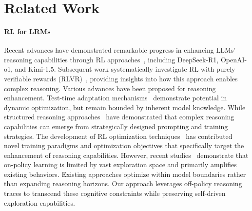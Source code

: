 \documentclass{article}
\begin{document}




\section{Related Work}

\paragraph{RL for LRMs}
Recent advances have demonstrated remarkable progress in enhancing LLMs' reasoning capabilities through RL approaches~\cite{r1, o1, kimik1.5, survey}, including DeepSeek-R1, OpenAI-o1, and Kimi-1.5.
Subsequent work systematically investigate RL with purely verifiable rewards (RLVR)~\cite{simplerl,orz,prime,drgrpo,opo}, providing insights into how this approach enables complex reasoning.
Various advances have been proposed for reasoning enhancement. Test-time adaptation mechanisms~\cite{muennighoff2025s1,zuo2025ttrl} demonstrate potential in dynamic optimization, but remain bounded by inherent model knowledge. 
While structured reasoning approaches~\cite{pang2025bolt,ye2025limo,fatemi2025concise,zhao2025absolutezero} have demonstrated that complex reasoning capabilities can emerge from strategically designed prompting and training strategies. The development of RL optimization techniques~\cite{su2025trust,wen2025light,yang2025thinking,drgrpo} has contributed novel training paradigms and optimization objectives that specifically target the enhancement of reasoning capabilities.
However, recent studies~\cite{zhao2025echochamberrlposttraining,rl_limits} demonstrate that on-policy learning is limited by vast exploration space and primarily amplifies existing behaviors.
Existing approaches optimize within model boundaries rather than expanding reasoning horizons.
Our approach leverages off-policy reasoning traces to transcend these cognitive constraints while preserving self-driven exploration capabilities.
\end{document}
